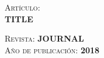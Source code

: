 
\newcommand{\revista}[4]{
\cleardoublepage
\vspace*{10cm}
\textsc{Artículo}:\\[5pt]
\uppercase{\textbf{#1}}\\
\bigskip

\textsc{Revista}: \uppercase{\textbf{#2}}\\

\textsc{Año de publicación}: \uppercase{\textbf{#3}}\\
\cleardoublepage

}

\revista{Title}{Journal}{2018}{journal}%
